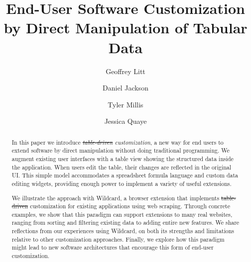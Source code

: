 \documentclass[sigplan,screen,10pt,anonymous,review]{acmart}
\providecommand{\DIFadd}[1]{{\protect\color{blue}\uwave{#1}}} %
\providecommand{\DIFdel}[1]{{\protect\color{red}\sout{#1}}}                      %
\providecommand{\DIFaddbegin}{} %
\providecommand{\DIFaddend}{} %
\providecommand{\DIFdelbegin}{} %
\providecommand{\DIFdelend}{} %
\begin{document}
\title{End-User Software Customization by Direct Manipulation of Tabular
Data}


\author{Geoffrey Litt}

\author{Daniel Jackson}

\author{Tyler Millis}

\author{Jessica Quaye}


\begin{abstract}
  In this paper we introduce \emph{\DIFdelbegin \DIFdel{table-driven }\DIFdelend \DIFaddbegin \DIFadd{data-driven }\DIFaddend customization}, a new way
  for end users to extend software by direct manipulation without doing
  traditional programming. We augment existing user interfaces with a
  table view showing the structured data inside the application. When
  users edit the table, their changes are reflected in the original UI.
  This simple model accommodates a spreadsheet formula language and
  custom data editing widgets, providing enough power to implement a
  variety of useful extensions.

  We illustrate the approach with Wildcard, a browser extension that
  implements \DIFdelbegin \DIFdel{table-driven }\DIFdelend \DIFaddbegin \DIFadd{data-driven }\DIFaddend customization for existing applications using
  web scraping. Through concrete examples, we show that this paradigm
  can support extensions to many real websites, ranging from sorting and
  filtering existing data to adding entire new features. We share
  reflections from our experiences using Wildcard, on both its strengths
  and limitations relative to other customization approaches. Finally,
  we explore how this paradigm might lead to new software architectures
  that encourage this form of end-user customization.
\end{abstract}
\end{document}
